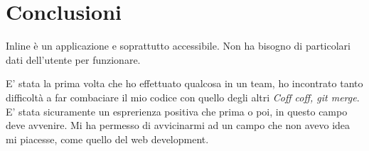 \chapter{Conclusioni}
Inline è un applicazione e soprattutto accessibile. Non ha bisogno di particolari dati dell'utente per funzionare.

E' stata la prima volta che ho effettuato qualcosa in un team, ho incontrato tanto difficoltà a far combaciare il mio codice con quello degli altri \textit{Coff coff, git merge}. E' stata sicuramente un esprerienza positiva che prima o poi, in questo campo deve avvenire.
Mi ha permesso di avvicinarmi ad un campo che non avevo idea mi piacesse, come quello del web development.
